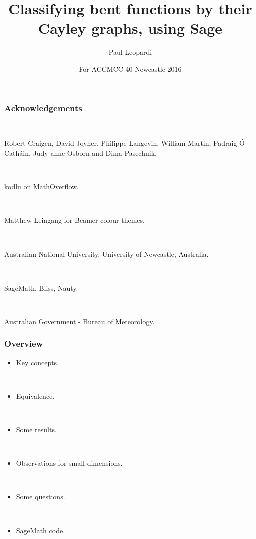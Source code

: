 \documentclass[pdf,sprung,slideColor,nocolorBG]{beamer}
\title{Classifying bent functions by their Cayley graphs, using Sage}
\author{Paul Leopardi}
\date{For ACCMCC 40 Newcastle 2016}
\institute{Australian Government - Bureau of Meteorology.}
\begin{document}
\frame{\titlepage}
\begin{frame}
\frametitle{Acknowledgements}
\begin{center}
~
 
Robert Craigen, David Joyner, Philippe Langevin, William Martin,
Padraig {\'O} Cath{\'a}in,
Judy-anne Osborn and Dima Pasechnik.

~

kodlu on MathOverflow.

~

Matthew Leingang for Beamer colour themes.

~

Australian National University. University of Newcastle, Australia.

~

SageMath, Bliss, Nauty.

~

Australian Government - Bureau of Meteorology.
\end{center}
\end{frame}

\begin{frame}
\frametitle{Overview}
\begin{itemize}
\item
Key concepts.

~

\item
Equivalence.

~

\item
Some results.

~

\item
Observations for small dimensions.

~

\item
Some questions.

~

\item
SageMath code.
\end{itemize}
 
\end{frame}
\end{document}
